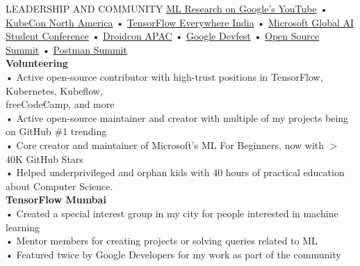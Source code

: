 \documentclass{resume} %
\begin{document}
\begin{rSection}{LEADERSHIP AND COMMUNITY}
\href{https://youtu.be/IeTibm880ys?list=LL&t=4318}{ML Research on Google's YouTube} • \href{https://kccncna2022.sched.com/event/184sa/cl-lightning-talk-open-source-kubernetes-and-cloudnative-from-the-eyes-of-a-high-schooler-rishit-dagli-narayana-junior-college-incoming-university-of-toronto}{KubeCon North America} • \href{https://youtu.be/LTtgaJLo378?t=7624}{TensorFlow Everywhere India} • \href{https://www.twitch.tv/videos/834577736}{Microsoft Global AI Student Conference} • \href{https://www.droidcon.com/media-detail?video=491094795}{Droidcon APAC} • \href{https://www.youtube.com/watch?v=5lr1IbTpwpI&feature=youtu.be&t=113}{Google Devfest} • \href{https://osslatam22.sched.com/event/15BrY}{Open Source Summit} • \href{https://www.google.com/url?q=https%3A%2F%2Fwww.twitch.tv%2Fvideos%2F1121993724%3Ft%3D01h36m00s&sa=D&sntz=1&usg=AOvVaw1pyXglg9cGjLBI_zwpsCrh}{Postman Summit}\\
{\bf Volunteering}\\
• Active open-source contributor with high-trust positions in TensorFlow, Kubernetes, Kubeflow,\\ freeCodeCamp, and more\\
• Active open-source maintainer and creator with multiple of my projects being on GitHub \#1 trending\\
• Core creator and maintainer of Microsoft's ML For Beginners, now with $>$40K GitHub Stars\\
• Helped underprivileged and orphan kids with 40 hours of practical education
about Computer Science.\\
{\bf TensorFlow Mumbai}\\
• Created a special interest group in my city for people interested in machine learning\\
• Mentor members for creating projects or solving queries related to ML\\
• Featured twice by Google Developers for my work as part of the community
\end{rSection}
\end{document}
